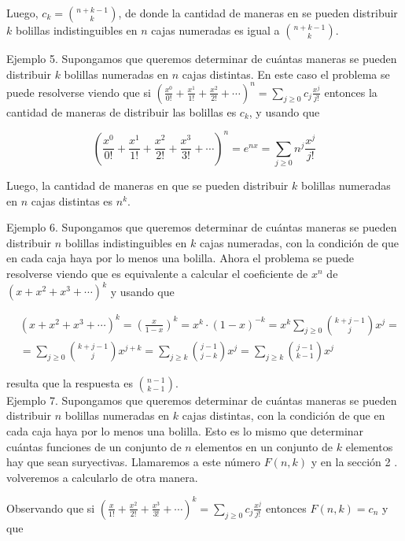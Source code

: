 \documentclass[10pt]{article}
\begin{document}
Luego, $c_{k}=\binom{n+k-1}{k}$, de donde la cantidad de maneras en se pueden distribuir $k$ bolillas indistinguibles en $n$ cajas numeradas es igual a $\binom{n+k-1}{k}$.

Ejemplo 5. Supongamos que queremos determinar de cuántas maneras se pueden distribuir $k$ bolillas numeradas en $n$ cajas distintas. En este caso el problema se puede resolverse viendo que si $\left(\frac{x^{0}}{0!}+\frac{x^{1}}{1!}+\frac{x^{2}}{2!}+\cdots\right)^{n}=\sum_{j \geq 0} c_{j} \frac{x^{j}}{j!}$ entonces la cantidad de maneras de distribuir las bolillas es $c_{k}$, y usando que

$$
\left(\frac{x^{0}}{0!}+\frac{x^{1}}{1!}+\frac{x^{2}}{2!}+\frac{x^{3}}{3!}+\cdots\right)^{n}=e^{n x}=\sum_{j \geq 0} n^{j} \frac{x^{j}}{j!}
$$

Luego, la cantidad de maneras en que se pueden distribuir $k$ bolillas numeradas en $n$ cajas distintas es $n^{k}$.

Ejemplo 6. Supongamos que queremos determinar de cuántas maneras se pueden distribuir $n$ bolillas indistinguibles en $k$ cajas numeradas, con la condición de que en cada caja haya por lo menos una bolilla. Ahora el problema se puede resolverse viendo que es equivalente a calcular el coeficiente de $x^{n}$ de $\left(x+x^{2}+x^{3}+\cdots\right)^{k}$ y usando que

$$
\begin{aligned}
& \left(x+x^{2}+x^{3}+\cdots\right)^{k}=\left(\frac{x}{1-x}\right)^{k}=x^{k} \cdot(1-x)^{-k}=x^{k} \sum_{j \geq 0}\binom{k+j-1}{j} x^{j}= \\
& =\sum_{j \geq 0}\binom{k+j-1}{j} x^{j+k}=\sum_{j \geq k}\binom{j-1}{j-k} x^{j}=\sum_{j \geq k}\binom{j-1}{k-1} x^{j}
\end{aligned}
$$

resulta que la respuesta es $\binom{n-1}{k-1}$.\\
Ejemplo 7. Supongamos que queremos determinar de cuántas maneras se pueden distribuir $n$ bolillas numeradas en $k$ cajas distintas, con la condición de que en cada caja haya por lo menos una bolilla. Esto es lo mismo que determinar cuántas funciones de un conjunto de $n$ elementos en un conjunto de $k$ elementos hay que sean suryectivas. Llamaremos a este número $F(n, k)$ y en la sección 2 . volveremos a calcularlo de otra manera.

Observando que si $\left(\frac{x}{1!}+\frac{x^{2}}{2!}+\frac{x^{3}}{3!}+\cdots\right)^{k}=\sum_{j \geq 0} c_{j} \frac{x^{j}}{j!}$ entonces $F(n, k)=c_{n}$ y que
\end{document}
